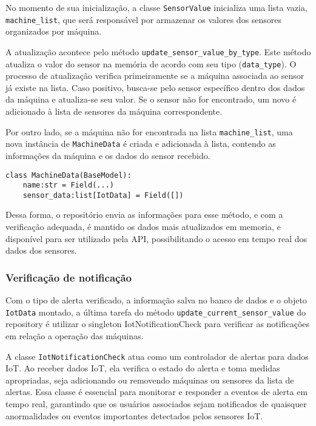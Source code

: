 No momento de sua inicialização, a classe \texttt{SensorValue} inicializa uma lista vazia, \texttt{machine\_list}, que será responsável por armazenar os valores dos sensores organizados por máquina.

A atualização acontece pelo método \texttt{update\_sensor\_value\_by\_type}. Este método atualiza o valor do sensor na memória de acordo com seu tipo (\texttt{data\_type}). O processo de atualização verifica primeiramente se a máquina associada ao sensor já existe na lista. Caso positivo, busca-se pelo sensor específico dentro dos dados da máquina e atualiza-se seu valor. Se o sensor não for encontrado, um novo é adicionado à lista de sensores da máquina correspondente.

Por outro lado, se a máquina não for encontrada na lista \texttt{machine\_list}, uma nova instância de \texttt{MachineData} é criada e adicionada à lista, contendo as informações da máquina e os dados do sensor recebido.

\begin{verbatim}
class MachineData(BaseModel):
    name:str = Field(...)
    sensor_data:list[IotData] = Field([])
\end{verbatim}

Dessa forma, o repositório envia as informações para esse método, e com a verificação adequada, é mantido os dados mais atualizados em memoria, e disponível para ser utilizado pela \gls{API}, possibilitando o acesso em tempo real dos dados dos sensores.


\subsubsection{Verificação de notificação}
Com o tipo de alerta verificado, a informação salva no banco de dados e o objeto \texttt{IotData} montado, a última tarefa do método \texttt{update\_current\_sensor\_value} do repository é utilizar o singleton IotNotificationCheck para verificar as notificações em relação a operação das máquinas.

A classe \texttt{IotNotificationCheck} atua como um controlador de alertas para dados IoT. Ao receber dados IoT, ela verifica o estado do alerta e toma medidas apropriadas, seja adicionando ou removendo máquinas ou sensores da lista de alertas. Essa classe é essencial para monitorar e responder a eventos de alerta em tempo real, garantindo que os usuários associados sejam notificados de quaisquer anormalidades ou eventos importantes detectados pelos sensores IoT.

